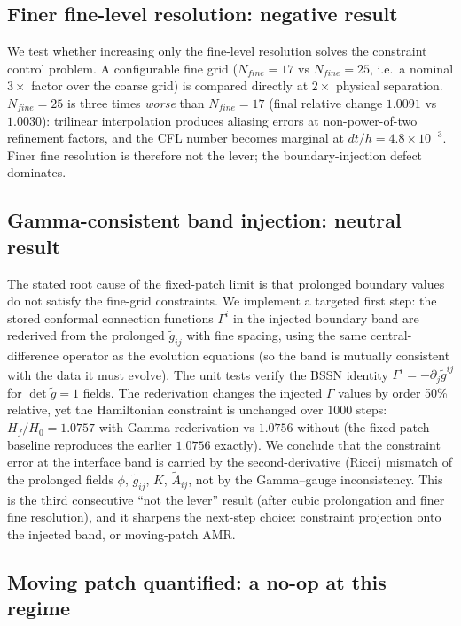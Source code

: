 \subsection{Finer fine-level resolution: negative result}

We test whether increasing only the fine-level resolution solves the
constraint control problem. A configurable fine grid ($N_{fine}=17$ vs
$N_{fine}=25$, i.e.\ a nominal $3\times$ factor over the coarse grid)
is compared directly at $2\times$ physical separation. $N_{fine}=25$
is three times \emph{worse} than $N_{fine}=17$ (final relative change
$1.0091$ vs $1.0030$): trilinear interpolation produces aliasing
errors at non-power-of-two refinement factors, and the CFL number
becomes marginal at $dt/h = 4.8\times10^{-3}$. Finer fine resolution
is therefore not the lever; the boundary-injection defect dominates.

\subsection{Gamma-consistent band injection: neutral result}

The stated root cause of the fixed-patch limit is that prolonged
boundary values do not satisfy the fine-grid constraints. We
implement a targeted first step: the stored conformal connection
functions $\Gamma^i$ in the injected boundary band are rederived from
the prolonged $\tilde g_{ij}$ with fine spacing, using the same
central-difference operator as the evolution equations (so the band
is mutually consistent with the data it must evolve). The unit tests
verify the BSSN identity $\Gamma^i = -\partial_j\tilde g^{ij}$ for
$\det\tilde g = 1$ fields. The rederivation changes the injected
$\Gamma$ values by order 50\% relative, yet the Hamiltonian
constraint is unchanged over 1000 steps: $H_f/H_0 = 1.0757$ with
Gamma rederivation vs $1.0756$ without (the fixed-patch baseline
reproduces the earlier $1.0756$ exactly). We conclude that the
constraint error at the interface band is carried by the
second-derivative (Ricci) mismatch of the prolonged fields
$\phi$, $\tilde g_{ij}$, $K$, $\tilde A_{ij}$, not by the
Gamma--gauge inconsistency. This is the third consecutive
``not the lever'' result (after cubic prolongation and finer fine
resolution), and it sharpens the next-step choice: constraint
projection onto the injected band, or moving-patch AMR.

\subsection{Moving patch quantified: a no-op at this regime}

